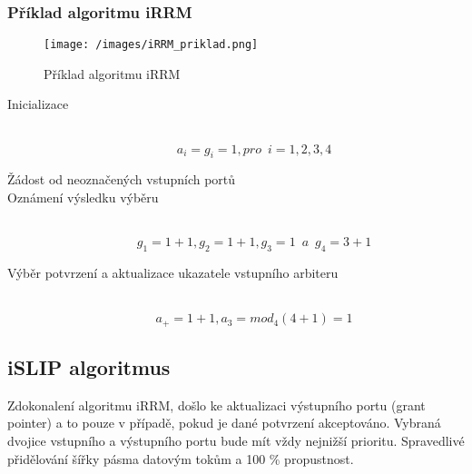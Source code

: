 \subsubsection{Příklad algoritmu iRRM}
\begin{figure}[ht]
\centering
  \begin{center}
    \texttt{[image: /images/iRRM\_priklad.png]}
  \end{center}
  \caption[Příklad algoritmu iRRM]{Příklad algoritmu iRRM}
\end{figure}
\begin{description}
  \item[Inicializace] \hfill \\
  \begin{equation}
      a_i = g_i = 1, pro \,\,\, i = 1, 2, 3, 4
  \end{equation}
  \item [Žádost od neoznačených vstupních portů] \hfill 
  \item [Oznámení výsledku výběru] \hfill \\
  \begin{equation}
      g_1 = 1 + 1, g_2 = 1 + 1, g_3 = 1\,\,\, a \,\,\, g_4 = 3 + 1
  \end{equation}
  \item [Výběr potvrzení a aktualizace ukazatele vstupního arbiteru] \hfill \\
\begin{equation}
    a_+ = 1 + 1, a_3 = mod_4{(4+1)} = 1
\end{equation}
\end{description}
\subsection{iSLIP algoritmus}
Zdokonalení algoritmu iRRM, došlo ke aktualizaci výstupního portu (grant pointer) a to pouze v případě, pokud je dané potvrzení akceptováno. Vybraná dvojice vstupního a výstupního portu bude mít vždy nejnižší prioritu. Spravedlivé přidělování šířky pásma datovým tokům a 100 \% propustnost.

